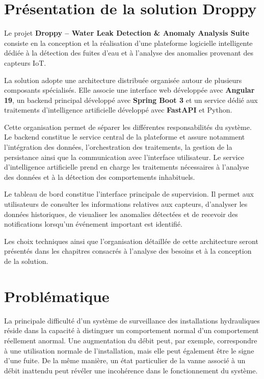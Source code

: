 \section{Présentation de la solution Droppy}

Le projet \textbf{Droppy -- Water Leak Detection \& Anomaly Analysis Suite}
consiste en la conception et la réalisation d'une plateforme logicielle
intelligente dédiée à la détection des fuites d'eau et à l'analyse des
anomalies provenant des capteurs IoT.

La solution adopte une architecture distribuée organisée autour de plusieurs
composants spécialisés. Elle associe une interface web développée avec
\textbf{Angular 19}, un backend principal développé avec
\textbf{Spring Boot 3} et un service dédié aux traitements d'intelligence
artificielle développé avec \textbf{FastAPI} et Python.

Cette organisation permet de séparer les différentes responsabilités du
système. Le backend constitue le service central de la plateforme et assure
notamment l'intégration des données, l'orchestration des traitements, la
gestion de la persistance ainsi que la communication avec l'interface
utilisateur. Le service d'intelligence artificielle prend en charge les
traitements nécessaires à l'analyse des données et à la détection des
comportements inhabituels.

Le tableau de bord constitue l'interface principale de supervision. Il permet
aux utilisateurs de consulter les informations relatives aux capteurs,
d'analyser les données historiques, de visualiser les anomalies détectées et
de recevoir des notifications lorsqu'un événement important est identifié.

Les choix techniques ainsi que l'organisation détaillée de cette architecture
seront présentés dans les chapitres consacrés à l'analyse des besoins et à la
conception de la solution.


\section{Problématique}

La principale difficulté d'un système de surveillance des installations
hydrauliques réside dans la capacité à distinguer un comportement normal
d'un comportement réellement anormal. Une augmentation du débit peut, par
exemple, correspondre à une utilisation normale de l'installation, mais elle
peut également être le signe d'une fuite. De la même manière, un état
particulier de la vanne associé à un débit inattendu peut révéler une
incohérence dans le fonctionnement du système.

